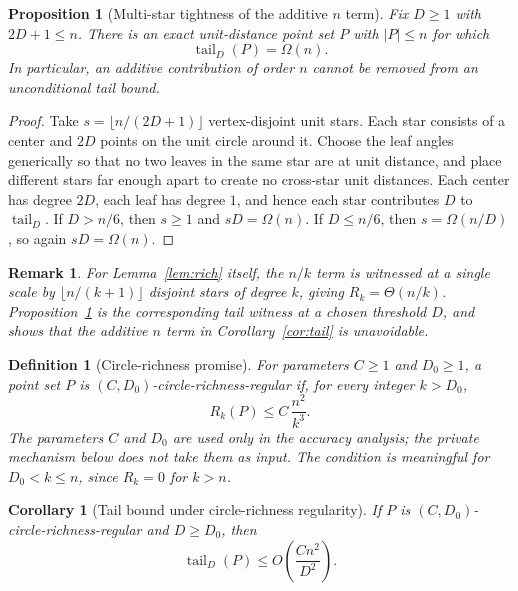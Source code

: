\documentclass[11pt]{article}
\newtheorem{corollary}[theorem]{Corollary}
\newtheorem{proposition}[theorem]{Proposition}
\newtheorem{definition}[theorem]{Definition}
\newtheorem{remark}[theorem]{Remark}
\newcommand{\tail}{\operatorname{tail}}
\begin{document}
\begin{proposition}[Multi-star tightness of the additive \(n\) term]
\label{prop:multistar}
Fix \(D\ge 1\) with \(2D+1\le n\). There is an exact unit-distance point set \(P\) with \(|P|\le n\) for which
\[
\tail_D(P)=\Omega(n).
\]
In particular, an additive contribution of order \(n\) cannot be removed from an unconditional tail bound.
\end{proposition}

\begin{proof}
Take \(s=\lfloor n/(2D+1)\rfloor\) vertex-disjoint unit stars. Each star consists of a center and \(2D\) points on the unit circle around it. Choose the leaf angles generically so that no two leaves in the same star are at unit distance, and place different stars far enough apart to create no cross-star unit distances. Each center has degree \(2D\), each leaf has degree \(1\), and hence each star contributes \(D\) to \(\tail_D\). If \(D>n/6\), then \(s\ge 1\) and \(sD=\Omega(n)\). If \(D\le n/6\), then \(s=\Omega(n/D)\), so again \(sD=\Omega(n)\).
\end{proof}

\begin{remark}
For Lemma~\ref{lem:rich} itself, the \(n/k\) term is witnessed at a single scale by \(\lfloor n/(k+1)\rfloor\) disjoint stars of degree \(k\), giving \(R_k=\Theta(n/k)\). Proposition~\ref{prop:multistar} is the corresponding tail witness at a chosen threshold \(D\), and shows that the additive \(n\) term in Corollary~\ref{cor:tail} is unavoidable.
\end{remark}

\begin{definition}[Circle-richness promise]
\label{def:circle-rich}
For parameters \(C\ge 1\) and \(D_0\ge 1\), a point set \(P\) is \((C,D_0)\)-circle-richness-regular if, for every integer \(k>D_0\),
\[
R_k(P)\le C\,\frac{n^2}{k^3}.
\]
The parameters \(C\) and \(D_0\) are used only in the accuracy analysis; the private mechanism below does not take them as input. The condition is meaningful for \(D_0<k\le n\), since \(R_k=0\) for \(k>n\).
\end{definition}

\begin{corollary}[Tail bound under circle-richness regularity]
\label{cor:promise-tail}
If \(P\) is \((C,D_0)\)-circle-richness-regular and \(D\ge D_0\), then
\[
\tail_D(P)\le O\!\left(\frac{C n^2}{D^2}\right).
\]
\end{corollary}
\end{document}
